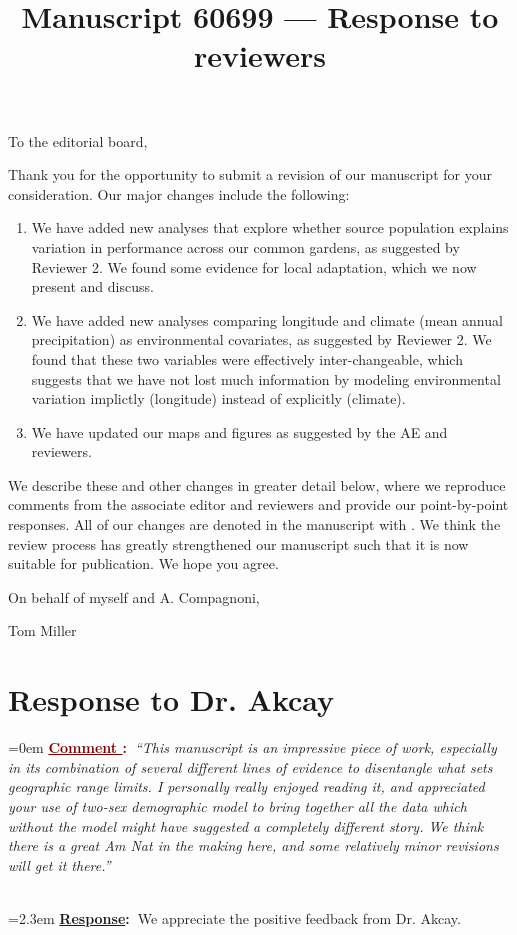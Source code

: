 \documentclass[12pt]{article}
\newcounter{cN}
\newcommand{\comment}[1]{
	\vspace{2em}
	\refstepcounter{cN} %
	\noindent \hangindent=0em \textbf{\textcolor{Maroon}{\uline{Comment \thecN}:~}}\emph{``#1''}
	}
\newcommand{\response}[1]{
	\\[0.25em]
	\hangindent=2.3em \textbf{\textcolor{NavyBlue}{\uline{Response}:~}}#1
	}
\newcommand{\revise}[1]{{\color{Mahogany}{#1}}}
\begin{document}
\title{Manuscript 60699 --- Response to reviewers}

\maketitle
\noindent To the editorial board,

Thank you for the opportunity to submit a revision of our manuscript for your consideration. Our major changes include the following:
\begin{enumerate}
	\item We have added new analyses that explore whether source population explains variation in performance across our common gardens, as suggested by Reviewer 2. We found some evidence for local adaptation, which we now present and discuss. 
	\item We have added new analyses comparing longitude and climate (mean annual precipitation) as environmental covariates, as suggested by Reviewer 2. We found that these two variables were effectively inter-changeable, which suggests that we have not lost much information by modeling environmental variation implictly (longitude) instead of explicitly (climate).
	\item We have updated our maps and figures as suggested by the AE and reviewers.
\end{enumerate}

We describe these and other changes in greater detail below, where we reproduce comments from the associate editor and reviewers and provide our point-by-point responses. 
All of our changes are denoted in the manuscript with \revise{Mahogany font}.
We think the review process has greatly strengthened our manuscript such that it is now suitable for publication.
We hope you agree. 

\vspace{2em}
\hfill On behalf of myself and A. Compagnoni,

\hfill Tom Miller
\newpage

\section{Response to Dr. Akcay}
\vspace{-2em}

\comment{This manuscript is an impressive piece of work, especially in its combination of several different lines of evidence to disentangle what sets geographic range limits. I personally really enjoyed reading it, and appreciated your use of two-sex demographic model to bring together all the data which without the model might have suggested a completely different story. We think there is a great Am Nat in the making here, and some relatively minor revisions will get it there.}
\response{We appreciate the positive feedback from Dr. Akcay.}
\end{document}
